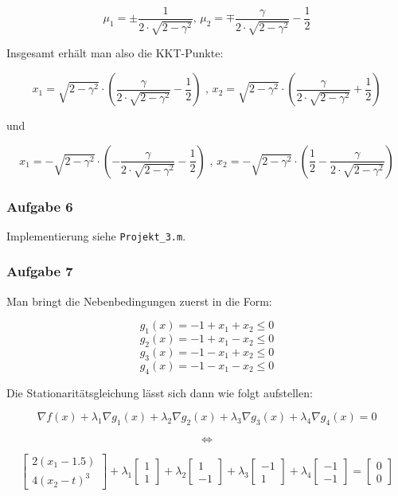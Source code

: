 \documentclass[a4paper, 12pt]{report}
\begin{document}
$$\mu_1 = \pm \frac{1}{2\cdot \sqrt{2 - \gamma^2}} \text{, } \mu_2 = \mp \frac{\gamma}{2\cdot \sqrt{2 - \gamma^2}} - \frac{1}{2}$$

Insgesamt erhält man also die KKT-Punkte:

$$x_1 = \sqrt{2 - \gamma^2} \cdot \left( \frac{\gamma}{2\cdot\sqrt{2 - \gamma^2}} - \frac{1}{2} \right) \text{ , } x_2 = \sqrt{2 - \gamma^2} \cdot \left( \frac{\gamma}{2\cdot\sqrt{2 - \gamma^2}} + \frac{1}{2} \right)$$

und

$$x_1 = -\sqrt{2 - \gamma^2}\cdot \left(-\frac{\gamma}{2\cdot \sqrt{2 - \gamma^2}} - \frac{1}{2}\right) \text{ , } x_2 = -\sqrt{2 - \gamma^2} \cdot \left( \frac{1}{2} - \frac{\gamma}{2\cdot\sqrt{2 - \gamma^2}} \right)$$

\subsubsection{Aufgabe 6}

Implementierung siehe \lstinline[basicstyle=\ttfamily\color{black}]|Projekt_3.m|.

\subsubsection{Aufgabe 7}

Man bringt die Nebenbedingungen zuerst in die Form:

$$g_1(x) = -1 + x_1 + x_2 \leq 0$$
$$g_2(x) = -1 + x_1 - x_2 \leq 0$$
$$g_3(x) = -1 - x_1 + x_2 \leq 0$$
$$g_4(x) = -1 - x_1 - x_2 \leq 0$$

Die Stationaritätsgleichung lässt sich dann wie folgt aufstellen:

$$\nabla  f(x) + \lambda_1\nabla g_1(x) + \lambda_2\nabla g_2(x) + \lambda_3\nabla g_3(x) + \lambda_4\nabla g_4(x) = 0$$

$$\Leftrightarrow$$

$$\begin{bmatrix}2(x_1 - 1.5)\\4(x_2 - t)^3\end{bmatrix} + \lambda_1 \begin{bmatrix}1\\1\end{bmatrix} + \lambda_2 \begin{bmatrix}1\\-1\end{bmatrix} + \lambda_3 \begin{bmatrix}-1\\1\end{bmatrix} + \lambda_4 \begin{bmatrix}-1\\-1\end{bmatrix} = \begin{bmatrix}0\\0\end{bmatrix}$$
\end{document}
